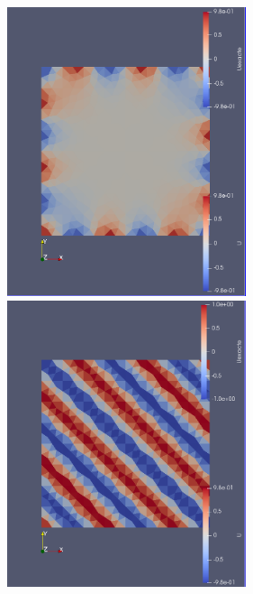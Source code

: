 \documentclass[11pt,a4paper]{scrartcl}%
\theoremstyle{plain}
\theoremstyle{definition}
\theoremstyle{remark}
\begin{document}
\begin{itemize}
\begin{itemize}
\begin{itemize}
		\includegraphics[width=7cm]{Ucalcule4}
		\includegraphics[width=7cm]{Uexacte4}\\
		\end{itemize}

	\end{itemize}
\end{itemize} 
\end{document}
